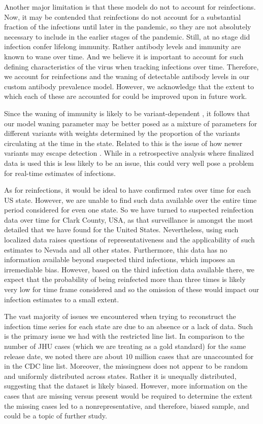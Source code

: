 \documentclass{article}
\begin{document}
Another major limitation is that these models do not to account for
reinfections. Now, it may be contended that reinfections do not account for a
substantial fraction of the infections until later in the pandemic, so they are
not absolutely necessary to include in the earlier stages of the pandemic.
Still, at no stage did infection confer lifelong immunity.
Rather antibody levels and immunity are known to wane over time. 
And we believe it is important to account for such defining characteristics of the virus when
tracking infections over time. Therefore, we account for reinfections and the waning
of detectable antibody levels in our custom antibody prevalence model. However, we 
acknowledge that the extent to which each of these are accounted for could be
improved upon in future work. 

Since the waning of immunity is likely to be variant-dependent
\citep{pooley2023durability}, it follows that our model waning parameter may be better
posed as a mixture of parameters for different variants with weights determined
by the proportion of the variants circulating at the time in the state. Related
to this is the issue of how newer variants may escape detection
\citep{nih2022assessing, fda2023sars}. While in a retrospective analysis where
finalized data is used this is less likely to be an issue, this could very well
pose a problem for real-time estimates of infections.

As for reinfections, it would be ideal to have confirmed rates
over time for each US state. However, we are unable to find such data available
over the entire time period considered for even one state. So we have turned to
suspected reinfection data over time for Clark County, USA, as that surveillance
is amongst the most detailed that we have found for the United States.
Nevertheless, using such localized data raises questions of representativeness
and the applicability of such estimates to Nevada and all other states.
Furthermore, this data has no information available beyond suspected third
infections, which imposes an irremediable bias. However, based on the third
infection data available there, we expect that the probability of being
reinfected more than three times is likely very low for time frame considered
and so the omission of these would impact our infection estimates to a small
extent. 

The vast majority of issues we encountered when trying to reconstruct the
infection time series for each state are due to an absence or a lack of data.
Such is the primary issue we had with the restricted line list. In comparison to
the number of JHU cases (which we are treating as a gold standard) for the same
release date, we noted there are about $10$ million cases that are unaccounted
for in the CDC line list. Moreover, the missingness does not appear to be random
and uniformly distributed across states. Rather it is unequally distributed,
suggesting that the dataset is likely biased. However, more information on the
cases that are missing versus present would be required to determine the extent
the missing cases led to a nonrepresentative, and therefore, biased sample, and
could be a topic of further study.
\end{document}

